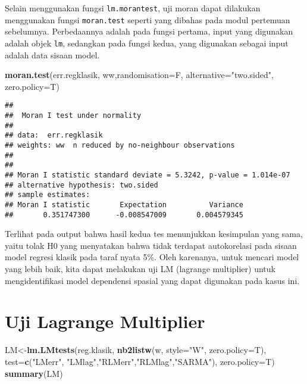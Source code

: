 \documentclass[
]{book}
\newenvironment{Shaded}{\begin{snugshade}}{\end{snugshade}}
\newcommand{\DataTypeTok}[1]{\textcolor[rgb]{0.13,0.29,0.53}{#1}}
\newcommand{\KeywordTok}[1]{\textcolor[rgb]{0.13,0.29,0.53}{\textbf{#1}}}
\newcommand{\NormalTok}[1]{#1}
\newcommand{\StringTok}[1]{\textcolor[rgb]{0.31,0.60,0.02}{#1}}
\begin{document}
Selain menggunakan fungsi \texttt{lm.morantest}, uji moran dapat dilakukan menggunakan fungsi \texttt{moran.test} seperti yang dibahas pada modul pertemuan sebelumnya. Perbedaannya adalah pada fungsi pertama, input yang digunakan adalah objek \texttt{lm}, sedangkan pada fungsi kedua, yang digunakan sebagai input adalah data sisaan model.

\begin{Shaded}
\begin{Highlighting}[]
\KeywordTok{moran.test}\NormalTok{(err.regklasik, ww,}\DataTypeTok{randomisation=}\NormalTok{F, }\DataTypeTok{alternative=}\StringTok{"two.sided"}\NormalTok{, }\DataTypeTok{zero.policy=}\NormalTok{T)}
\end{Highlighting}
\end{Shaded}

\begin{verbatim}
## 
##  Moran I test under normality
## 
## data:  err.regklasik  
## weights: ww  n reduced by no-neighbour observations
##   
## 
## Moran I statistic standard deviate = 5.3242, p-value = 1.014e-07
## alternative hypothesis: two.sided
## sample estimates:
## Moran I statistic       Expectation          Variance 
##       0.351747300      -0.008547009       0.004579345
\end{verbatim}

Terlihat pada output bahwa hasil kedua tes menunjukkan kesimpulan yang sama, yaitu tolak H0 yang menyatakan bahwa tidak terdapat autokorelasi pada sisaan model regresi klasik pada taraf nyata 5\%. Oleh karenanya, untuk mencari model yang lebih baik, kita dapat melakukan uji LM (lagrange multiplier) untuk mengidentifikasi model dependensi spasial yang dapat digunakan pada kasus ini.

\hypertarget{uji-lagrange-multiplier}{%
\section{Uji Lagrange Multiplier}\label{uji-lagrange-multiplier}}

\begin{Shaded}
\begin{Highlighting}[]
\NormalTok{LM\textless{}{-}}\KeywordTok{lm.LMtests}\NormalTok{(reg.klasik, }\KeywordTok{nb2listw}\NormalTok{(w, }\DataTypeTok{style=}\StringTok{"W"}\NormalTok{, }\DataTypeTok{zero.policy=}\NormalTok{T),}
               \DataTypeTok{test=}\KeywordTok{c}\NormalTok{(}\StringTok{"LMerr"}\NormalTok{, }\StringTok{"LMlag"}\NormalTok{,}\StringTok{"RLMerr"}\NormalTok{,}\StringTok{"RLMlag"}\NormalTok{,}\StringTok{"SARMA"}\NormalTok{), }\DataTypeTok{zero.policy=}\NormalTok{T)}
\KeywordTok{summary}\NormalTok{(LM)}
\end{Highlighting}
\end{Shaded}
\end{document}

